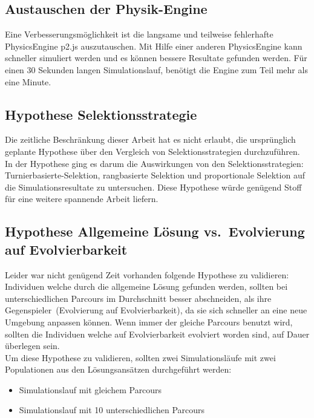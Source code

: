     \subsection{Austauschen der Physik-Engine}

      Eine Verbesserungsmöglichkeit ist die langsame und teilweise fehlerhafte \gls{PhysicsEngine} p2.js auszutauschen.
      Mit Hilfe einer anderen \gls{PhysicsEngine} kann schneller simuliert werden und
      es können bessere Resultate gefunden werden.
      Für einen 30 Sekunden langen Simulationslauf, benötigt die Engine zum Teil mehr als eine Minute.

    \subsection{Hypothese Selektionsstrategie\label{sub:hypoSelect}}

      Die zeitliche Beschränkung dieser Arbeit hat es nicht erlaubt,
      die ursprünglich geplante Hypothese über den Vergleich von Selektionsstrategien durchzuführen.
      In der Hypothese ging es darum die Auswirkungen von den Selektionsstrategien:
      Turnierbasierte-Selektion, rangbasierte Selektion
      und proportionale Selektion auf die Simulationsresultate zu untersuchen.
      Diese Hypothese würde genügend Stoff für eine weitere spannende Arbeit liefern.

    \subsection{Hypothese Allgemeine Lösung vs.\ Evolvierung auf Evolvierbarkeit\label{sub:hypoAnsatz}}

      Leider war nicht genügend Zeit vorhanden folgende Hypothese zu validieren:
      Individuen welche durch die allgemeine Lösung gefunden werden,
      sollten bei unterschiedlichen Parcours im Durchschnitt besser abschneiden,
      als ihre Gegenspieler~(Evolvierung auf Evolvierbarkeit),
      da sie sich schneller an eine neue Umgebung anpassen können.
      Wenn immer der gleiche Parcours benutzt wird,
      sollten die Individuen welche auf Evolvierbarkeit evolviert worden sind, auf Dauer überlegen sein.
      \\
      Um diese Hypothese zu validieren,
      sollten zwei Simulationsläufe mit zwei Populationen aus den Lösungsansätzen durchgeführt werden:

      \begin{itemize}
        \item Simulationslauf mit gleichem Parcours
        \item Simulationslauf mit 10 unterschiedlichen Parcours
      \end{itemize}

